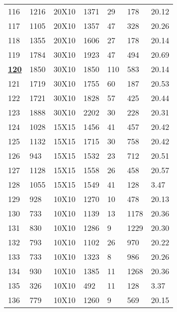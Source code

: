\documentclass[14pt]{acmsiggraph}
\begin{document}
\begin{table}[h!]
\begin{center}
{\begin{tabular}{||lllllll}
					116 & 1216 & 20X10  & \cellcolor[rgb]{0.58,0.73,0.33}1371 & 29  & 178  & 20.12 \\
					117 & 1105 & 20X10  & \cellcolor[rgb]{0.69,0.78,0.38}1357 & 47  & 328  & 20.26 \\
					118 & 1355 & 20X10  & \cellcolor[rgb]{0.64,0.76,0.36}1606 & 27  & 178  & 20.14 \\
					119 & 1784 & 30X10  & \cellcolor[rgb]{0.52,0.71,0.31}1923 & 47  & 494  & 20.69 \\
					\underline{\textbf{120}} & 1850 & 30X10  & \cellcolor[rgb]{0.43,0.67,0.27}1850 & 110 & 583  & 20.14 \\
					121 & 1719 & 30X10  & \cellcolor[rgb]{0.45,0.68,0.28}1755 & 60  & 187  & 20.53 \\
					122 & 1721 & 30X10  & \cellcolor[rgb]{0.5,0.7,0.3}1828    & 57  & 425  & 20.44 \\
					123 & 1888 & 30X10  & \cellcolor[rgb]{0.62,0.75,0.35}2202 & 30  & 228  & 20.31 \\
					124 & 1028 & 15X15  & \cellcolor[rgb]{0.9,0.87,0.47}1456  & 41  & 457  & 20.42 \\
					125 & 1132 & 15X15  & \cellcolor[rgb]{1,0.89,0.5}1715     & 30  & 758  & 20.42 \\
					126 & 943  & 15X15  & \cellcolor[rgb]{1,0.69,0.39}1532    & 23  & 712  & 20.51 \\
					127 & 1128 & 15X15  & \cellcolor[rgb]{0.86,0.86,0.45}1558 & 26  & 458  & 20.57 \\
					128 & 1055 & 15X15  & \cellcolor[rgb]{0.96,0.9,0.5}1549   & 41  & 128  & 3.47  \\
					129 & 928  & 10X10  & \cellcolor[rgb]{0.85,0.85,0.45}1270 & 10  & 478  & 20.13 \\
					130 & 733  & 10X10  & \cellcolor[rgb]{1,0.82,0.46}1139    & 13  & 1178 & 20.36 \\
					131 & 830  & 10X10  & \cellcolor[rgb]{1,0.83,0.46}1286    & 9   & 1229 & 20.30 \\
					132 & 793  & 10X10  & \cellcolor[rgb]{0.87,0.86,0.46}1102 & 26  & 970  & 20.22 \\
					133 & 733  & 10X10  & \cellcolor[rgb]{1,0.36,0.2}1323     & 8   & 986  & 20.26 \\
					134 & 930  & 10X10  & \cellcolor[rgb]{0.98,0.91,0.5}1385  & 11  & 1268 & 20.36 \\
					135 & 326  & 10X10  & \cellcolor[rgb]{1,0.9,0.5}492       & 11  & 128  & 3.37  \\
					136 & 779  & 10X10  & \cellcolor[rgb]{1,0.7,0.39}1260     & 9   & 569  & 20.15 \\

\end{tabular}}
\end{center}
\end{table}
\end{document}

